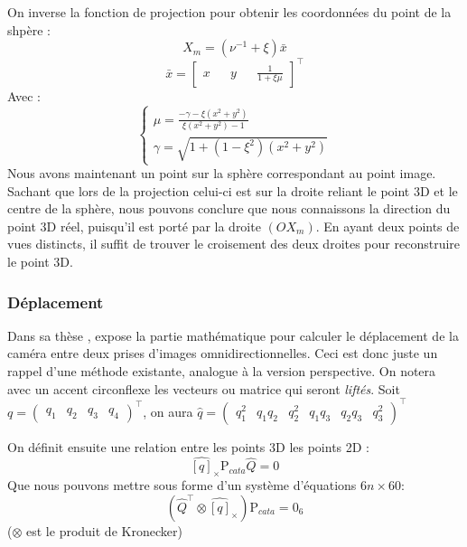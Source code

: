 On inverse la fonction de projection pour obtenir les coordonnées du point de la shpère :
\begin{equation}
X_m = (\nu^{-1} + \xi) \bar{x}
\end{equation}
\begin{equation}
\bar{x} = \begin{bmatrix}x && y && \frac{1}{1+\xi \mu} \end{bmatrix}^{\top}
\end{equation}
Avec :
\begin{equation}
  \left \{
  \begin{matrix}
    \mu = \frac{-\gamma-\xi(x^2+y^2)}{\xi(x^2+y^2)-1} \\
    \gamma = \sqrt{1+(1-\xi^2)(x^2+y^2)}
  \end{matrix}
 \right.
\end{equation}
Nous avons maintenant un point sur la sphère correspondant au point image.
Sachant que lors de la projection celui-ci est sur la droite reliant le point 3D et le centre de la sphère, nous pouvons conclure que nous connaissons la direction du point 3D réel, puisqu'il est porté par la droite $(OX_m)$.
En ayant deux points de vues distincts, il suffit de trouver le croisement des deux droites pour reconstruire le point 3D.

\subsubsection{Déplacement}

Dans sa thèse \cite{Puig11PhD}, \citeauthor{Puig11PhD} expose la partie mathématique pour calculer le déplacement de la caméra entre deux prises d'images omnidirectionnelles.
Ceci est donc juste un rappel d'une méthode existante, analogue à la version perspective.
On notera avec un accent circonflexe les vecteurs ou matrice qui seront \emph{liftés}.
Soit $q=\begin{pmatrix}q_1&q_2&q_3&q_4\end{pmatrix}^\top$, on aura $\hat{q} = \begin{pmatrix}q_1^2&q_1q_2&q_2^2&q_1q_3&q_2q_3&q_3^2\end{pmatrix}^\top$

On définit ensuite une relation entre les points 3D les points 2D :
\begin{equation}
\widehat{[q]}_\times \text{P}_{cata} \hat{Q} = 0
\end{equation}
Que nous pouvons mettre sous forme d'un système d'équations $6n\times60$:
\begin{equation}
\left( \hat{Q}^{\top} \otimes \widehat{[q]}_\times \right) \text{P}_{cata}  = 0_6
\end{equation}
($\otimes$ est le produit de Kronecker)

